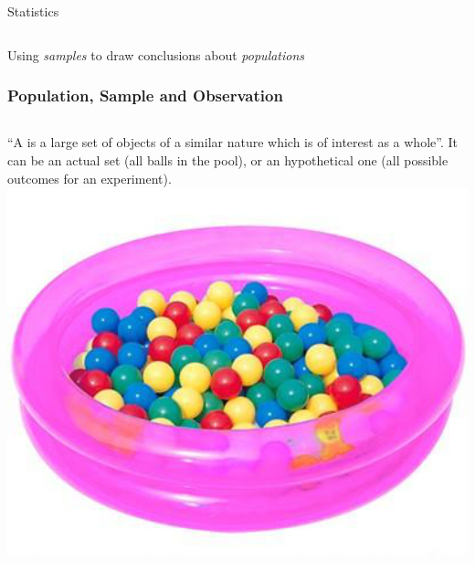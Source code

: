\documentclass[10pt]{beamer}
\begin{document}
\begin{frame}
\begin{columns}
\begin{block}{Statistics}
\begin{center}
      \end{center}
    \end{block}
  \end{columns}

  \bigskip

   Using \emph{samples} to draw
  conclusions about \emph{populations}
\end{frame}

\begin{frame}
  \frametitle{Population, Sample and Observation}
  \begin{columns}
     ``A  is a large set
    of objects of a similar nature which is of interest as a
    whole''. It can be an actual set (all balls in the pool), or an
    hypothetical one (all possible outcomes for an experiment).
    \includegraphics[width=1\textwidth]{img/ballpool}
  \end{columns}
  \vspace{.6cm}
  \begin{columns}

\end{columns}
\end{frame}
\end{document}
